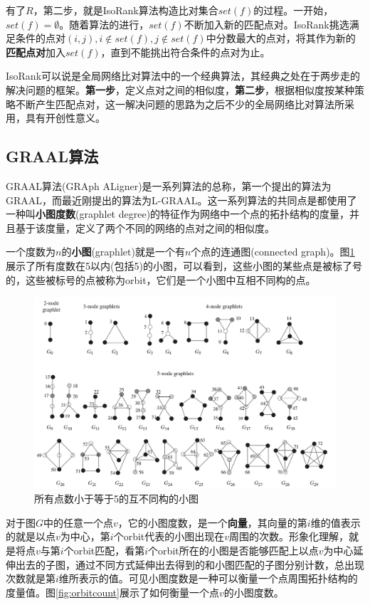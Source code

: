 有了$R$，第二步，就是IsoRank算法构造比对集合$set(f)$的过程。一开始，$set(f)=\emptyset$。随着算法的进行，$set(f)$不断加入新的匹配点对。IsoRank挑选满足条件的点对$(i,j),i\notin set(f),j\notin set(f)$中分数最大的点对，将其作为新的\textbf{匹配点对}加入$set(f)$，直到不能挑出符合条件的点对为止。

IsoRank可以说是全局网络比对算法中的一个经典算法，其经典之处在于两步走的解决问题的框架。\textbf{第一步}，定义点对之间的相似度，\textbf{第二步}，根据相似度按某种策略不断产生匹配点对，这一解决问题的思路为之后不少的全局网络比对算法所采用，具有开创性意义。
\subsection{GRAAL算法}
GRAAL算法(GRAph ALigner)是一系列算法的总称，第一个提出的算法为GRAAL\cite{kuchaiev2010topological}，而最近刚提出的算法为L-GRAAL\cite{malod2015graal}。这一系列算法的共同点是都使用了一种叫\textbf{小图度数}(graphlet degree)的特征作为网络中一个点的拓扑结构的度量，并且基于该度量，定义了两个不同的网络的点对之间的相似度。

一个度数为$n$的\textbf{小图}(graphlet)就是一个有$n$个点的连通图(connected graph)。图\ref{fig:graphlet}展示了所有度数在5以内(包括5)的小图，可以看到，这些小图的某些点是被标了号的，这些被标号的点被称为orbit，它们是一个小图中互相不同构的点。

\begin{figure}[htbp]
\centering
\includegraphics[width=\textwidth]{pic/graphlet.png}
\captionsetup{margin=50pt}
\caption{所有点数小于等于5的互不同构的小图\cite{kuchaiev2010topological}}\label{fig:graphlet}
\end{figure}

对于图$G$中的任意一个点$v$，它的小图度数，是一个\textbf{向量}，其向量的第$i$维的值表示的就是以点$v$为中心，第$i$个orbit代表的小图出现在$v$周围的次数。形象化理解，就是将点$v$与第$i$个orbit匹配，看第$i$个orbit所在的小图是否能够匹配上以点$v$为中心延伸出去的子图，通过不同方式延伸出去得到的和小图匹配的子图分别计数，总出现次数就是第$i$维所表示的值。可见小图度数是一种可以衡量一个点周围拓扑结构的度量值。图\ref{fig:orbitcount}展示了如何衡量一个点$v$的小图度数。

